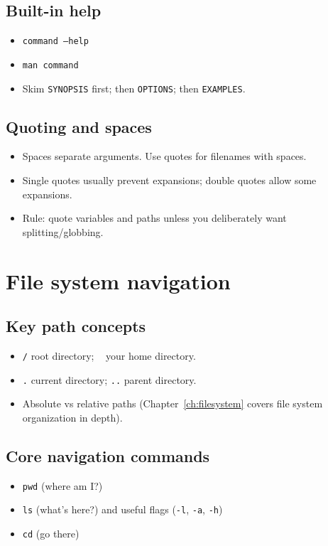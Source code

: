 \subsection{Built-in help}
\begin{itemize}
\item \texttt{command --help}
\item \texttt{man command}
\item Skim \texttt{SYNOPSIS} first; then \texttt{OPTIONS}; then \texttt{EXAMPLES}.
\end{itemize}

\subsection{Quoting and spaces}
\begin{itemize}
\item Spaces separate arguments. Use quotes for filenames with spaces.
\item Single quotes usually prevent expansions; double quotes allow some expansions.
\item Rule: quote variables and paths unless you deliberately want splitting/globbing.
\end{itemize}

\section{File system navigation}
\subsection{Key path concepts}
\begin{itemize}
\item \texttt{/} root directory; \texttt{~} your home directory.
\item \texttt{.} current directory; \texttt{..} parent directory.
\item Absolute vs relative paths (Chapter~\ref{ch:filesystem} covers file system organization in depth).
\end{itemize}

\subsection{Core navigation commands}
\begin{itemize}
\item \texttt{pwd} (where am I?)
\item \texttt{ls} (what's here?) and useful flags (\texttt{-l}, \texttt{-a}, \texttt{-h})
\item \texttt{cd} (go there)
\end{itemize}

